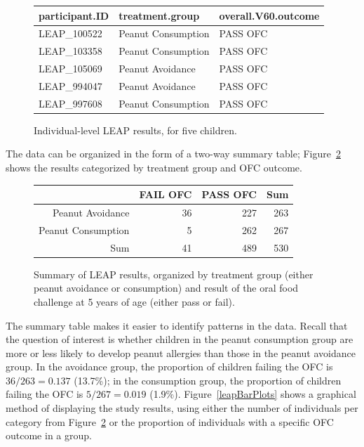 
\begin{figure}[ht]
\centering
\begin{tabular}{lll}
  \hline
participant.ID & treatment.group & overall.V60.outcome \\ 
  \hline
LEAP\_100522 & Peanut Consumption & PASS OFC \\ 
  LEAP\_103358 & Peanut Consumption & PASS OFC \\ 
  LEAP\_105069 & Peanut Avoidance & PASS OFC \\ 
  LEAP\_994047 & Peanut Avoidance & PASS OFC \\ 
  LEAP\_997608 & Peanut Consumption & PASS OFC \\ 
   \hline
\end{tabular}
\caption{Individual-level LEAP results, for five children.}
\label{leapStudyResultsDF}
\end{figure}


The data can be organized in the form of a two-way summary table; Figure~\ref{leapStudyResults} shows the results categorized by treatment group and OFC outcome. 

\begin{figure}[ht]
\centering
\begin{tabular}{rrrr}
  \hline
 & FAIL OFC & PASS OFC & Sum \\ 
  \hline
Peanut Avoidance & 36 & 227 & 263 \\ 
  Peanut Consumption & 5 & 262 & 267 \\ 
  Sum & 41 & 489 & 530 \\ 
   \hline
\end{tabular}
\caption{Summary of LEAP results, organized by treatment group (either peanut avoidance or consumption) and result of the oral food challenge at 5 years of age (either pass or fail).} 
\label{leapStudyResults}
\end{figure}

\textD{\newpage}

The summary table makes it easier to identify patterns in the data. Recall that the question of interest is whether children in the peanut consumption group are more or less likely to develop peanut allergies than those in the peanut avoidance group. In the avoidance group, the proportion of children failing the OFC is $36/263 = 0.137$ (13.7\%); in the consumption group, the proportion of children failing the OFC is $5/267 = 0.019$ (1.9\%).  Figure~\ref{leapBarPlots} shows a graphical method of displaying the study results, using either the number of individuals per category from Figure~\ref{leapStudyResults} or the proportion of individuals with a specific OFC outcome in a group. 

